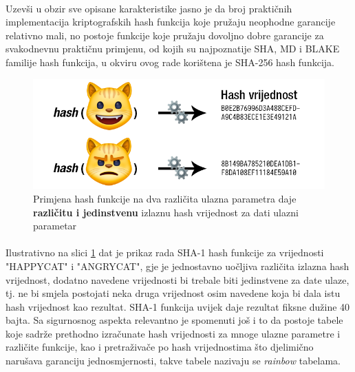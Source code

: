 \paragraph*{}
Uzevši u obzir sve opisane karakteristike jasno je da broj praktičnih implementacija kriptografskih hash funkcija koje pružaju neophodne garancije relativno mali, no postoje funkcije koje pružaju dovoljno dobre garancije za svakodnevnu praktičnu primjenu, od kojih su najpoznatije SHA, MD i BLAKE familije hash funkcija, u okviru ovog rade korištena je SHA-256 hash funkcija.

\begin{figure}[H]
    \centering
    \includegraphics[width=1.0\textwidth]{material/hash_dia}
    \caption{Primjena hash funkcije na dva različita ulazna parametra daje \textbf{različitu i jedinstvenu} izlaznu hash vrijednost za dati ulazni parametar}
    \label{fig:hash_dia}
\end{figure}

\paragraph*{}
Ilustrativno na slici \ref{fig:hash_dia} dat je prikaz rada SHA-1 hash funkcije za vrijednosti "HAPPYCAT" i "ANGRYCAT", gje je jednostavno uočljiva različita izlazna hash vrijednost, dodatno navedene vrijednosti bi trebale biti jedinstvene za date ulaze, tj. ne bi smjela postojati neka druga vrijednost osim navedene koja bi dala istu hash vrijednost kao rezultat. SHA-1 funkcija uvijek daje rezultat fiksne dužine 40 bajta. Sa sigurnosnog aspekta relevantno je spomenuti još i to da postoje tabele koje sadrže prethodno izračunate hash vrijednosti za mnoge ulazne parametre i različite funkcije, kao i pretraživače po hash vrijednostima što djelimično narušava garanciju jednosmjernosti, takve tabele nazivaju se \textit{rainbow} tabelama.

